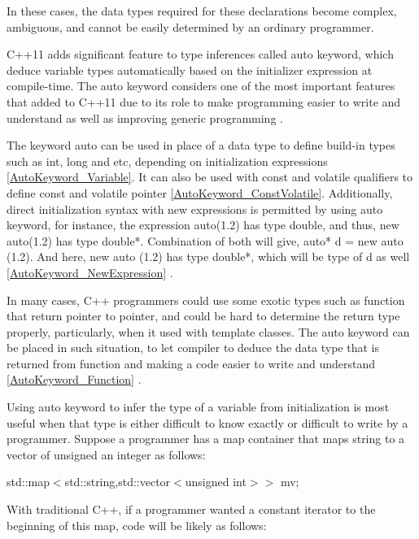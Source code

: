 \documentclass[11pt]{report}
\begin{document}
In these cases, the data types required for these declarations become complex, ambiguous, and cannot be easily determined by an ordinary programmer.
\newline

C++11 adds significant feature to type inferences called auto keyword, which deduce variable types automatically based on the initializer expression at compile-time.  The auto keyword considers one of the most important features that added to C++11 due to its role to make programming easier to write and understand as well as improving generic programming \cite{Gregorie:professionalcpp}.
\newline

The keyword auto can be used in place of a data type to define build-in types such as int, long and etc, depending on initialization expressions \ref{AutoKeyword_Variable}. It can also be used with const and volatile qualifiers to define const and volatile pointer \ref{AutoKeyword_ConstVolatile}. Additionally, direct initialization syntax with new expressions is permitted by using auto keyword, for instance, the expression auto(1.2) has type double, and thus, new auto(1.2) has type double*. Combination of both will give, auto* d = new auto (1.2). And here, new auto (1.2) has type double*, which will be type of d as well \ref{AutoKeyword_NewExpression} \cite{Stroustrup:2012:Cpp11}.

In many cases, C++ programmers could use some exotic types such as function that return pointer to pointer, and could be hard to determine the return type properly, particularly, when it used with template classes. The auto keyword can be placed in such situation, to let compiler to deduce the data type that is returned from function and making a code easier to write and understand \ref{AutoKeyword_Function} \cite{Overland:2011:CWF}.
\newline

Using auto keyword to infer the type of a variable from initialization is most useful when that type is either difficult to know exactly or difficult to write by a programmer. Suppose a programmer has a map container that maps string to a vector of unsigned an integer as follows: 

\begin{center}
std::map$<$std::string,std::vector$<$unsigned int$>>$ mv;
\end{center}

With traditional C++, if a programmer wanted a constant iterator to the beginning of this map, code will be likely as follows:
\end{document}
